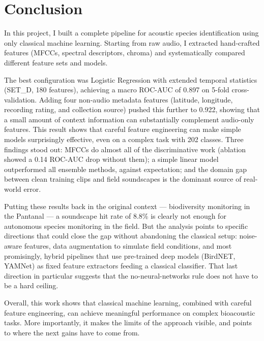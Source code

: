 \documentclass[11pt,a4paper]{article}
\begin{document}
\section{Conclusion}

In this project, I built a complete pipeline for acoustic species identification using only classical machine learning. Starting from raw audio, I extracted hand-crafted features (MFCCs, spectral descriptors, chroma) and systematically compared different feature sets and models.

The best configuration was Logistic Regression with extended temporal statistics (SET\_D, 180 features), achieving a macro ROC-AUC of 0.897 on 5-fold cross-validation. Adding four non-audio metadata features (latitude, longitude, recording rating, and collection source) pushed this further to 0.922, showing that a small amount of context information can substantially complement audio-only features. This result shows that careful feature engineering can make simple models surprisingly effective, even on a complex task with 202 classes. Three findings stood out: MFCCs do almost all of the discriminative work (ablation showed a 0.14 ROC-AUC drop without them); a simple linear model outperformed all ensemble methods, against expectation; and the domain gap between clean training clips and field soundscapes is the dominant source of real-world error.

Putting these results back in the original context — biodiversity monitoring in the Pantanal — a soundscape hit rate of 8.8\% is clearly not enough for autonomous species monitoring in the field. But the analysis points to specific directions that could close the gap without abandoning the classical setup: noise-aware features, data augmentation to simulate field conditions, and most promisingly, hybrid pipelines that use pre-trained deep models (BirdNET, YAMNet) as fixed feature extractors feeding a classical classifier. That last direction in particular suggests that the no-neural-networks rule does not have to be a hard ceiling.

Overall, this work shows that classical machine learning, combined with careful feature engineering, can achieve meaningful performance on complex bioacoustic tasks. More importantly, it makes the limits of the approach visible, and points to where the next gains have to come from.
\end{document}
